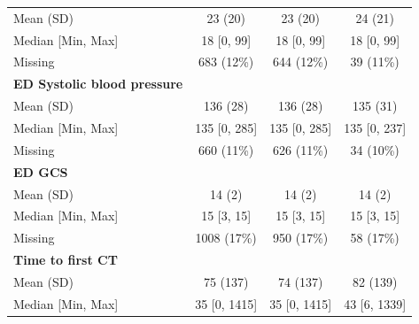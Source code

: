 \documentclass[12pt, a4paper]{article}
\begin{document}
\begin{table}[t!]
{\begin{tabular}{lccc}
            \hspace{3mm}Mean (SD)                         & 23 (20)           & 23 (20)           & 24 (21)          \\
            \hspace{3mm}Median [Min, Max]                 & 18 [0, 99]        & 18 [0, 99]        & 18 [0, 99]       \\
            \hspace{3mm}Missing                           & 683 (12\%)        & 644 (12\%)        & 39 (11\%)        \\
            \textbf{ED Systolic blood pressure}           &                   &                   &                  \\
            \hspace{3mm}Mean (SD)                         & 136 (28)          & 136 (28)          & 135 (31)         \\
            \hspace{3mm}Median [Min, Max]                 & 135 [0, 285]      & 135 [0, 285]      & 135 [0, 237]     \\
            \hspace{3mm}Missing                           & 660 (11\%)        & 626 (11\%)        & 34 (10\%)        \\
            \textbf{ED GCS}                               &                   &                   &                  \\
            \hspace{3mm}Mean (SD)                         & 14 (2)            & 14 (2)            & 14 (2)           \\
            \hspace{3mm}Median [Min, Max]                 & 15 [3, 15]        & 15 [3, 15]        & 15 [3, 15]       \\
            \hspace{3mm}Missing                           & 1008 (17\%)       & 950 (17\%)        & 58 (17\%)        \\
            \textbf{Time to first CT}                     &                   &                   &                  \\
            \hspace{3mm}Mean (SD)                         & 75 (137)          & 74 (137)          & 82 (139)         \\
            \hspace{3mm}Median [Min, Max]                 & 35 [0, 1415]      & 35 [0, 1415]      & 43 [6, 1339]     \\

\end{tabular}}
\end{table}
\end{document}
